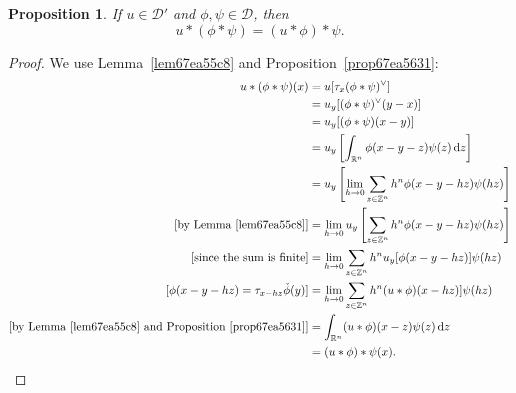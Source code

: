 \documentclass[a4paper,9pt]{amsart}
\newcommand{\scr}[1]{\mathscr{#1}}
\newcommand{\Z}{\mathbb{Z}}	%
\newcommand{\R}{\mathbb{R}}	%
\newcommand{\did}{\,\mathrm{d}}	%
\theoremstyle{plain}
\newtheorem{proposition}{Proposition}[section]
\theoremstyle{definition}
\theoremstyle{remark}
\begin{document}
\begin{proposition}\label{prop67f2992e}
	If $u\in\scr D'$ and $\phi,\psi\in\scr D$, then
	\begin{equation}\label{eq67e288dc}
		u*(\phi*\psi) = (u*\phi)*\psi .
	\end{equation}
\end{proposition}
\begin{proof}
	We use Lemma~\ref{lem67ea55c8} and Proposition~\ref{prop67ea5631}:
	\begin{align*}
	 	u*(\phi*\psi)(x)
		&= u[\tau_x(\phi*\psi)^\vee] \\
		&= u_y[(\phi*\psi)^\vee(y-x)] \\
		&= u_y[(\phi*\psi)(x-y)] \\
		&= u_y\left[ \int_{\R^n} \phi(x-y-z) \psi(z) \did z \right] \\
		&= u_y\left[ \lim_{h\to0} \sum_{z\in\Z^n} h^n \phi(x-y-hz) \psi(hz)  \right] \\
		[\text{by Lemma~\ref{lem67ea55c8}}]
		&=\lim_{h\to0} u_y\left[ \sum_{z\in\Z^n} h^n \phi(x-y-hz) \psi(hz)  \right] \\
		[\text{since the sum is finite}]
		&= \lim_{h\to0} \sum_{z\in\Z^n} h^n u_y[\phi(x-y-hz)] \psi(hz) \\
		[\phi(x-y-hz) = \tau_{x-hz}\check\phi(y)]
		&= \lim_{h\to0} \sum_{z\in\Z^n} h^n (u*\phi)(x-hz)] \psi(hz) \\
		[\text{by Lemma~\ref{lem67ea55c8} and Proposition~\ref{prop67ea5631}}]
		&= \int_{\R^n} (u*\phi)(x-z) \psi(z) \did z \\
		&= (u*\phi)*\psi(x) .
	\end{align*}
\end{proof}
\end{document}
